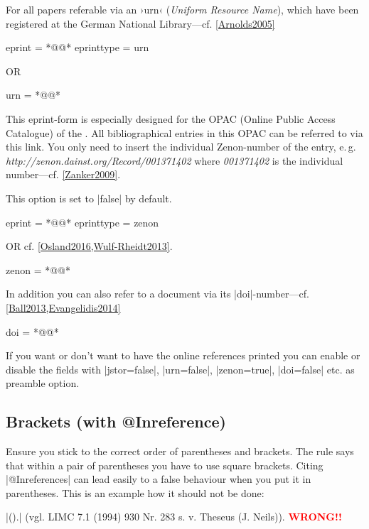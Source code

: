 \documentclass[a4paper,
10pt,
greek,
french,
spanish,
italian,
ngerman,
english
]{ltxdoc}
\begin{document}
For all papers referable via an ›urn‹ (\emph{Uniform Resource Name}), which have been registered at the German National Library---cf. \cref{Arnolds2005}
\begin{code}
eprint = *@@*
eprinttype = {urn} 
\end{code}      

OR
\begin{code}
urn = *@@*
\end{code}  

This eprint-form is especially designed for the OPAC (Online Public Access Catalogue) of the \DAI.
All bibliographical entries in this OPAC can be referred to via this link.
You only need to insert the individual Zenon-number of the entry, e.\,g. \emph{http://zenon.dainst.org/Record/001371402} where \emph{001371402} is the individual number---cf. \cref{Zanker2009}.

This option is set to |false| by default.
\begin{code}
eprint = *@@*
eprinttype = {zenon} 
\end{code}      
OR  cf. \cref{Osland2016,Wulf-Rheidt2013}.
\begin{code}
zenon = *@@*
\end{code}      


 In addition you can also refer to a document via its |doi|-number---cf. \cref{Ball2013,Evangelidis2014} 
\begin{code}
doi = *@@*
\end{code}  

If you want or don’t want to have the online references printed you can enable or disable the fields with |jstor=false|, 
|urn=false|,
|zenon=true|,
|doi=false| etc. as preamble option.

\subsection{Brackets (with @Inreference)}\label{faq:inreference}
Ensure you stick to the correct order of parentheses and brackets.
The rule says that within a pair of parentheses you have to use square brackets.
Citing |@Inreferences| can lead easily to a false behaviour when you put it in parentheses.
This is an example how it should not be done:
\begin{tcolorbox}[examplebox]
|(\cite[vgl.][930 Nr. 283]{Neils1994}).| 
\tcblower
(vgl. LIMC 7.1 (1994) 930 Nr. 283 s. v. Theseus (J. Neils)). \textcolor{red}{\textbf{WRONG!!}}
\end{tcolorbox}
 
\end{document}
